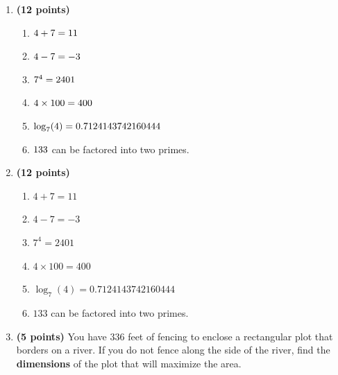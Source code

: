 \documentclass[12pt]{amsart}
\begin{document}
\begin{enumerate}
\item {\bf (12 points)} 
 \begin{enumerate}
\item $\atwothree + \btwothree = \sumtwothree$
\item $\atwothree - \btwothree = \diftwothree$
\item $\btwothree^{\atwothree} = \powtwothree$
\item $\atwothree \times 100 = \bigtwothree$
\item $\log_{\btwothree}(\atwothree) = \logtwothree$
\item $\factortwothree$ can be factored into two primes.
\end{enumerate} 
\vfill 
\def \a{7}\def \atwoone{1}\def \atwotwo{3}\def \atwothree{4}\def \btwothree{7}\def \sumtwothree{11}\def \diftwothree{-3}\def \bigtwothree{400}\def \powtwothree{2401}\def \logtwothree{0.7124143742160444}\def \factortwothree{133}\def \atwofour{1.26}\def \btwofour{1.774}\def \tooshorttwofour{10.1}\def \moneytwofour{10.10}\def \longertwofour{10.10000}\def \atwofive{0.12}\def \btwofive{0.12346}\def \athreeone{4}\def \bthreeone{6}\def \setthreetwo{[12, 6, 9]}\def \athreetwo{12}\def \bthreetwo{6}\def \cthreetwo{9}\def \controlthreethree{-4}\def \athreethree{1}\def \topthreethree{0}\def \athreefour{3}\def \bthreefour{2}\def \listthreefour{[1, 2, 4, 5]}\def \afourone{12}\def \bfourone{-8}\def \fracfourone{\frac{-3}{2}}\def \rootfourtwo{20}\def \simplifiedfourtwo{2 \sqrt{5}}\def \sqrtlistfourtwo{[2, 5]}\def \outfourtwo{2}\def \infourtwo{5}\def \wowfourtwo{1}\def \afourthree{5}\def \nicethreefour{3x^{2}-x^{}+5}\def \nastythreefour{xyz^{3}+5}\def \cfourthree{4}\def \dfourthree{9}\def \infourthree{4x^{}}\def \outfourthree{+9y^{}}\def \afourfour{1867725}\def \nicefourfour{1,867,725}\def \goodfourfour{1,000,000.12345}\def \badfourfour{1,000,000.1}
\item {\bf (12 points)} 
 \begin{enumerate}
\item $\atwothree + \btwothree = \sumtwothree$
\item $\atwothree - \btwothree = \diftwothree$
\item $\btwothree^{\atwothree} = \powtwothree$
\item $\atwothree \times 100 = \bigtwothree$
\item $\log_{\btwothree}(\atwothree) = \logtwothree$
\item $\factortwothree$ can be factored into two primes.
\end{enumerate} 
\vfill 
\newpage\def \x{84}\def \y{168}\def \L{336}\def \area{14112}
\item {\bf (5 points)} 
 You have $\L$ feet of fencing to enclose a rectangular plot that borders on a river. If you do not fence along the side of the river, find the \textbf{dimensions} of the plot that will maximize the area. \\


\end{enumerate}
\end{document}
